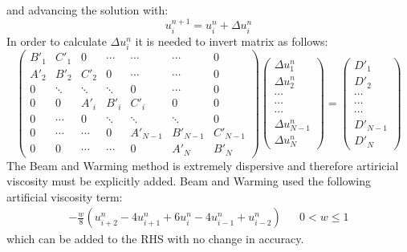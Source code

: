 \documentclass[11pt, a4paper]{article}
\begin{document}
and advancing the solution with:
\begin{equation}
    u_i^{n+1}=u_i^n+\Delta u_i^n
\end{equation}
In order to calculate $\Delta u^n_i$ it is needed to invert matrix as follows:
\begin{equation}
    \begin{pmatrix}
        B'_1 & C'_1 & 0 & \cdots & \cdots & \cdots & 0 \\
        A'_2 & B'_2 & C'_2 & 0 & \cdots & \cdots & 0 \\
        0 & \ddots & \ddots & \ddots & 0 & \cdots & 0 \\
        0 & 0 & A'_i & B'_i & C'_i & 0 & 0 \\
        0 & \cdots & 0 & \ddots & \ddots & \ddots & 0 \\
        0 & \cdots & \cdots & 0 & A'_{N-1} & B'_{N-1} & C'_{N-1} \\
        0 & 0 & \cdots & \cdots & 0 & A'_{N} &B'_{N}
    \end{pmatrix}
    \begin{pmatrix}
        \Delta u_1^n\\
        \Delta u_2^n\\
        \cdots\\
        \cdots\\
        \cdots\\
        \Delta u_{N-1}^n\\
        \Delta u_{N}^n
    \end{pmatrix}
    =
    \begin{pmatrix}
        D'_1\\
        D'_2\\
        \cdots\\
        \cdots\\
        \cdots\\
        D'_{N-1}\\
        D'_{N}
    \end{pmatrix}
\end{equation}
The Beam and Warming method is extremely dispersive and therefore artiricial viscosity must be explicitly added. Beam and Warming used the following artificial viscosity term:
\begin{equation}
    \begin{matrix}
        \displaystyle-\frac{w}{8}\left(u^n_{i+2}-4u^n_{i+1}+6u^n_i-4u^n_{i-1}+u^n_{i-2}\right) && 0<w\le1
    \end{matrix}
\end{equation}
which can be added to the RHS with no change in accuracy.
\end{document}
